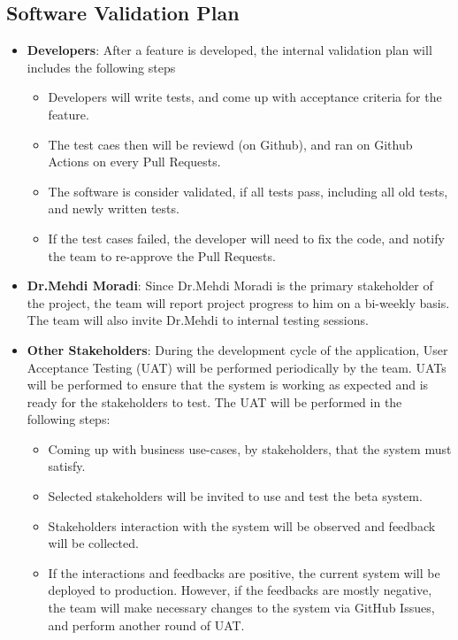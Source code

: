 \documentclass[12pt, titlepage]{article}
\begin{document}
\subsection{Software Validation Plan}
\begin{itemize}
  \item{\textbf{Developers}: After a feature is developed, the internal validation plan will includes the following steps}
  \begin{itemize}
    \item{Developers will write tests, and come up with acceptance criteria for the feature.}
    \item{The test caes then will be reviewd (on Github), and ran on Github Actions on every Pull Requests.}
    \item{The software is consider validated, if all tests pass, including all old tests, and newly written tests.}
    \item{If the test cases failed, the developer will need to fix the code, and notify the team to re-approve the Pull Requests.}
  \end{itemize}
  \item{\textbf{Dr.Mehdi Moradi}: Since Dr.Mehdi Moradi is the primary stakeholder of the project, the team will report project progress to him on a bi-weekly basis. The team will also invite Dr.Mehdi to internal testing sessions.}
  \item{\textbf{Other Stakeholders}: During the development cycle of the application, User Acceptance Testing (UAT) will be performed periodically by the team. UATs will be performed to ensure that the system is working as expected and is ready for the stakeholders to test. The UAT will be performed in the following steps:}
  \begin{itemize}
    \item{Coming up with business use-cases, by stakeholders, that the system must satisfy.}
    \item{Selected stakeholders will be invited to use and test the beta system.}
    \item{Stakeholders interaction with the system will be observed and feedback will be collected.}
    \item{If the interactions and feedbacks are positive, the current system will be deployed to production. However, if the feedbacks are mostly negative, the team will make necessary changes to the system via GitHub Issues, and perform another round of UAT.}
  \end{itemize}
\end{itemize}
\end{document}
